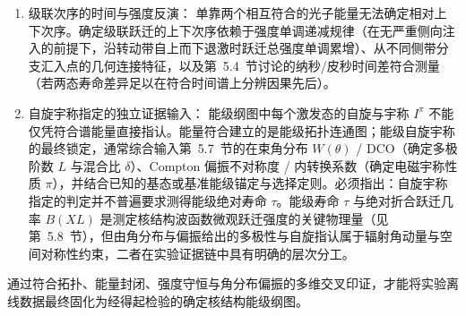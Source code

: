 \begin{enumerate}
\begin{equation}
I_{\mathrm{tot}, k} = I_{\gamma, k} (1 + \alpha_{\mathrm{IC}, k}).
\end{equation}
若某能级观测到的光子流入明显小于流出，常暗示存在来自高能连续区或侧带的未分辨馈入；若流入显著大于流出，则指示存在强内转换的未观测低能跃迁（$\alpha_{\mathrm{IC}} \gg 1$）。需要特别说明：在真正达到稳态且完全时间积分的闭合衰变网络中，总强度是严格守恒的，寿命本身并不会在稳态下消灭流量；若核态存在长寿命异能态延迟（$\tau_{\mathrm{isomer}} > \Delta T_{\mathrm{coin}}$）或处于脉冲束流的非稳态建立期，下游跃迁强度在有限时间门宽内将呈现表观的流入/流出不平衡，数据分析时须明确时间积分窗口与稳态建立的边界条件（肖骁 2019 硕士学位论文，PDF 第~24--26~页，印刷第~16--18~页~\cite{xiao-xiao-2019-high-spin-74as-thesis}）。
\item 级联次序的时间与强度反演：
单靠两个相互符合的光子能量无法确定相对上下次序。确定级联跃迁的上下次序依赖于强度单调递减规律（在无严重侧向注入的前提下，沿转动带自上而下退激时跃迁总强度单调累增）、从不同侧带分支汇入点的几何连接特征，以及第~5.4~节讨论的纳秒/皮秒时间差符合测量（若两态寿命差异足以在符合时间谱上分辨因果先后）。
\item 自旋宇称指定的独立证据输入：
能级纲图中每个激发态的自旋与宇称 $I^\pi$ 不能仅凭符合谱能量直接指认。能量符合建立的是能级拓扑连通图；能级自旋宇称的最终锁定，通常综合输入第~5.7~节的在束角分布 $W(\theta)$ / DCO（确定多极阶数 $L$ 与混合比 $\delta$）、Compton 偏振不对称度 / 内转换系数（确定电磁宇称性质 $\pi$），并结合已知的基态或基准能级锚定与选择定则。必须指出：自旋宇称指定的判定并不普遍要求测得能级绝对寿命 $\tau$。能级寿命 $\tau$ 与绝对折合跃迁几率 $B(XL)$ 是测定核结构波函数微观跃迁强度的关键物理量（见第~5.8~节），但由角分布与偏振给出的多极性与自旋指认属于辐射角动量与空间对称性约束，二者在实验证据链中具有明确的层次分工。
\end{enumerate}
通过符合拓扑、能量封闭、强度守恒与角分布偏振的多维交叉印证，才能将实验离线数据最终固化为经得起检验的确定核结构能级纲图。
